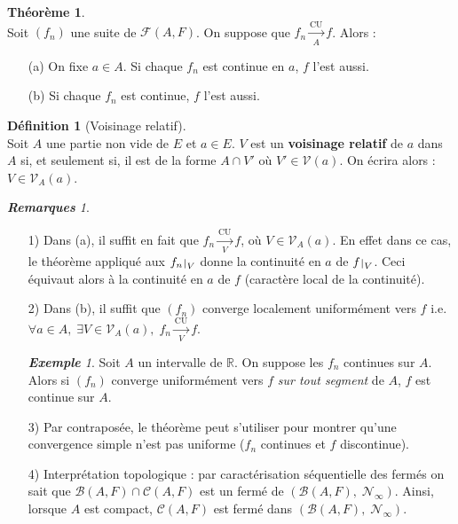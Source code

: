 \documentclass[12pt]{book}
\let\ensembleNombre\mathbb
\newcommand*\R{\ensuremath{\ensembleNombre{R}}}
\newcommand*\B{\ensuremath{\mathcal B}}
\def\restriction#1#2{\mathchoice
				{\setbox1\hbox{${\displaystyle #1}_{\scriptstyle #2}$}
				\restrictionaux{#1}{#2}}
				{\setbox1\hbox{${\textstyle #1}_{\scriptstyle #2}$}
				\restrictionaux{#1}{#2}}
				{\setbox1\hbox{${\scriptstyle #1}_{\scriptscriptstyle #2}$}
				\restrictionaux{#1}{#2}}
				{\setbox1\hbox{${\scriptscriptstyle #1}_{\scriptscriptstyle #2}$}
				\restrictionaux{#1}{#2}}}
\def\restrictionaux#1#2{{#1\, \smash{\vrule height .8\ht1 depth .85\dp1}}_{\,#2}}
\newcommand{\lu}[1]{\ensuremath{\overset{\mathrm{CU}}{\underset{#1}{\longrightarrow}}}}
\theoremstyle{definition}
\newtheorem*{defi}{Définition}
\newtheorem{thme}{Théorème}[chapter]
\theoremstyle{remark}
\newtheorem*{rems}{\textbf{Remarques}}
\newtheorem*{ex}{\textbf{Exemple}}
\newenvironment{fdef}
  {\begin{mdframed}[roundcorner=10pt, linewidth=1pt]\begin{defi}}
  {\end{defi}\end{mdframed}}
\newenvironment{fthme}
  {\begin{mdframed}[roundcorner=10pt, linewidth=2pt]\begin{thme}}
  {\end{thme}\end{mdframed}}
\begin{document}
	\begin{fthme}\mbox{~}\\
	Soit $(f_n)$ une suite de $\mathcal F(A,F)$. On suppose que $f_n \lu A f$. Alors :
	\begin{itemize}
	\item[(a)] On fixe $a \in A$. Si chaque $f_n$ est continue en $a$, $f$ l'est aussi.
	\item[(b)] Si chaque $f_n$ est continue, $f$ l'est aussi.
	\end{itemize}
	\end{fthme}
	
	\begin{fdef}[Voisinage relatif]\mbox{~}\\
	Soit $A$ une partie non vide de $E$ et $a \in E$. $V$ est un \textbf{voisinage relatif} de $a$ dans $A$ si, et seulement si, il est de la forme $A \cap V'$ où $V' \in \mathcal V(a)$. On écrira alors : $V \in \mathcal V_A(a)$.
	\end{fdef}
	
	\begin{rems}\mbox{~}\\
	\begin{itemize}
	\item[1)] Dans (a), il suffit en fait que $f_n \lu V f$, où $V \in \mathcal V_A(a)$. En effet dans ce cas, le théorème appliqué aux $\restriction{f_n}{V}$ donne la continuité en $a$ de $\restriction{f}{V}$. Ceci équivaut alors à la continuité en $a$ de $f$ (caractère local de la continuité).
	\item[2)] Dans (b), il suffit que $(f_n)$ converge localement uniformément vers $f$ i.e. $\forall a \in A,\; \exists V \in \mathcal V_A(a),\; f_n \lu V f$.
		\begin{ex}
		Soit $A$ un intervalle de $\R$. On suppose les $f_n$ continues sur $A$. Alors si $(f_n)$ converge uniformément vers $f$ \textit{sur tout segment} de $A$, $f$ est continue sur $A$.
		\end{ex}
	\item[3)] Par contraposée, le théorème peut s'utiliser pour montrer qu'une convergence simple n'est pas uniforme ($f_n$ continues et $f$ discontinue).
	\item[4)] Interprétation topologique : par caractérisation séquentielle des fermés on sait que $\B(A,F) \cap \mathcal C(A,F)$ est un fermé de $(\B(A,F),\; \mathcal N_\infty)$. Ainsi, lorsque $A$ est compact, $\mathcal C(A,F)$ est fermé dans $(\B(A,F), \; \mathcal N_\infty)$.
	\end{itemize}
	\end{rems}
	
\end{document}

